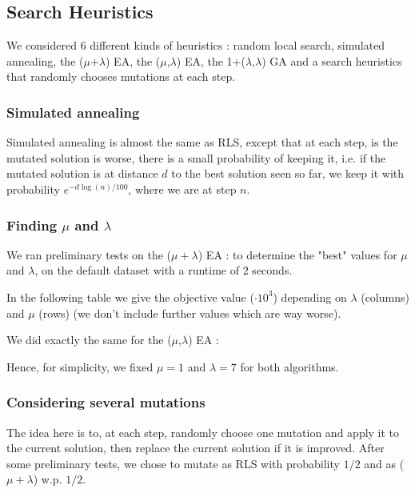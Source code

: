 \documentclass[a4paper]{article}
\begin{document}
\subsection{Search Heuristics}
We considered 6 different kinds of heuristics : random local search, simulated annealing, the ($\mu$+$\lambda$) EA, the ($\mu$,$\lambda$) EA, the 1+($\lambda$,$\lambda$) GA and a search heuristics that randomly chooses mutations at each step.
\subsubsection{Simulated annealing}
Simulated annealing is almost the same as RLS, except that at each step, is the mutated solution is worse, there is a small probability of keeping it, i.e. if the mutated solution is at distance $d$ to the best solution seen so far, we keep it with probability $e^{-d\log(n)/100}$, where we are at step $n$.

\subsubsection{Finding $\mu$ and $\lambda$}
We ran preliminary tests on the ($\mu + \lambda$) EA : to determine the "best" values for $\mu$ and $\lambda$, on the default dataset with a runtime of $2$ seconds.

In the following table we give the objective value ($\cdot 10^3$) depending on $\lambda$ (columns) and $\mu$ (rows) (we don't include further values which are way worse). 

\begin{center}
\end{center}

We did exactly the same for the ($\mu$,$\lambda$) EA :


\begin{center}
\end{center}

Hence, for simplicity, we fixed $\mu=1$ and $\lambda=7$ for both algorithms.

\subsubsection{Considering several mutations}
The idea here is to, at each step, randomly choose one mutation and apply it to the current solution, then replace the current solution if it is improved. After some preliminary tests, we chose to mutate as RLS with probability $1/2$ and as ($\mu + \lambda$) w.p. $1/2$.
\end{document}
